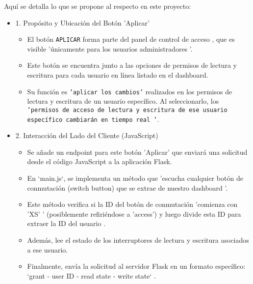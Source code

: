 \documentclass{report}
\begin{document}
Aquí se detalla lo que se propone al respecto en este proyecto:
\begin{itemize}
    \item 1. Propósito y Ubicación del Botón 'Aplicar'
    \begin{itemize}
        \item El botón \texttt{APLICAR} forma parte del  panel de control de acceso , que es visible  'únicamente para los usuarios administradores '.
        \item Este botón se encuentra junto a las opciones de permisos de lectura y escritura para cada usuario en línea listado en el dashboard.
        \item Su función es \texttt{'aplicar los cambios'} realizados en los permisos de lectura y escritura de un usuario específico. Al seleccionarlo, 
                  los \texttt{ 'permisos de acceso de lectura y escritura de ese usuario específico cambiarán en tiempo real '}.    
    \end{itemize}

    \item 2. Interacción del Lado del Cliente (JavaScript)
    \begin{itemize}
        \item Se añade un  endpoint para este botón 'Aplicar'  que enviará una solicitud desde el código JavaScript a la aplicación Flask.
        \item En `main.js`, se implementa un método que  'escucha cualquier botón de conmutación (switch button) que se extrae de nuestro dashboard '.
        \item Este método verifica si la ID del botón de conmutación  'comienza con 'XS' ' (posiblemente refiriéndose a 'access') y luego  divide esta ID 
        para extraer la ID del usuario .
        \item Además, lee el  estado de los interruptores de lectura y escritura  asociados a ese usuario.
        \item Finalmente, envía la solicitud al servidor Flask en un formato específico:  `grant - user ID - read state - write state` .    
    \end{itemize}


\end{itemize}
\end{document}
